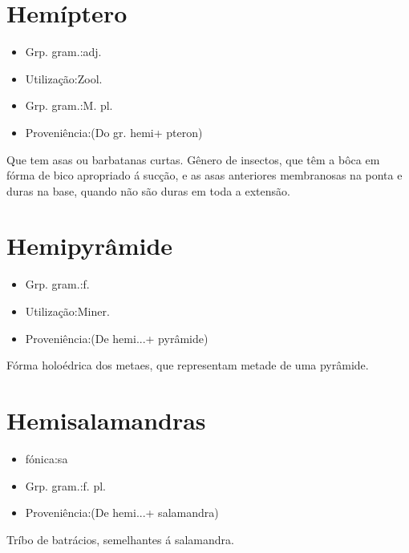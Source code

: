 \documentclass{article}
\begin{document}
\section{Hemíptero}
\begin{itemize}
\item {Grp. gram.:adj.}
\end{itemize}
\begin{itemize}
\item {Utilização:Zool.}
\end{itemize}
\begin{itemize}
\item {Grp. gram.:M. pl.}
\end{itemize}
\begin{itemize}
\item {Proveniência:(Do gr. \textunderscore hemi\textunderscore  + \textunderscore pteron\textunderscore )}
\end{itemize}
Que tem asas ou barbatanas curtas.
Gênero de insectos, que têm a bôca em fórma de bico apropriado á sucção, e as asas anteriores membranosas na ponta e duras na base, quando não são duras em toda a extensão.
\section{Hemipyrâmide}
\begin{itemize}
\item {Grp. gram.:f.}
\end{itemize}
\begin{itemize}
\item {Utilização:Miner.}
\end{itemize}
\begin{itemize}
\item {Proveniência:(De \textunderscore hemi...\textunderscore  + \textunderscore pyrâmide\textunderscore )}
\end{itemize}
Fórma holoédrica dos metaes, que representam metade de uma pyrâmide.
\section{Hemisalamandras}
\begin{itemize}
\item {fónica:sa}
\end{itemize}
\begin{itemize}
\item {Grp. gram.:f. pl.}
\end{itemize}
\begin{itemize}
\item {Proveniência:(De \textunderscore hemi...\textunderscore  + \textunderscore salamandra\textunderscore )}
\end{itemize}
Tríbo de batrácios, semelhantes á salamandra.
\end{document}
